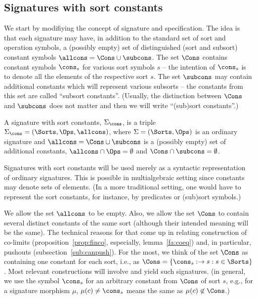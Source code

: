 
\subsection{Signatures with sort constants}\label{sub:gsp}
We start by modifiying the concept of signature and specification. The idea
is that each signature may have, in addition to the standard set of sort and
operation symbols, a (possibly empty) set of distinguished (sort and subsort) constant
symbols $\allcons = \Cons\cup\subcons$. 
The set $\Cons$ %
contains  constant symbols
$\cons_s$ for various sort symbols $s$ -- the intention of $\cons_s$ is to denote all the elements of the respective
sort $s$. 
The set $\subcons$  may contain additional constants
which will represent various subsorts -- the constants from this set are
called ``subsort constants''. (Usually, the distinction between $\Cons$ and
$\subcons$ does not matter and then we will write ``(sub)sort constants''.)
\begin{definition}
\label{def:modsign}
A signature with sort constants, $\Sigma_\cons$, is a triple $\Sigma_\cons =
 (\Sorts,\Ops,\allcons)$, where $\Sigma=(\Sorts,\Ops)$ is an ordinary
 signature and $\allcons=\Cons\cup\subcons$ is a (possibly empty) set of additional constants,
 $\allcons\cap\Ops=\emptyset$ and $\Cons\cap\subcons=\emptyset$. 
\end{definition}
%
Signatures with sort constants will be used merely as a syntactic representation of 
ordinary signatures. This is possible in multialgebraic setting since
constants may denote sets of elements. (In a more traditional setting, one would
have to represent the sort constants, for instance, by predicates or (sub)sort symbols.)

We allow the set $\allcons$ to be empty. Also, we allow the set
$\Cons$ to contain several distinct constants of the same sort (although
their intended meaning will be the same).
The technical reasons for that come up in relating construction of co-limits
(proposition~\ref{prop:finco}, especially, lemma~\ref{fa:coeq}) and, in particular, pushouts
(subsection~\ref{sub:canpush}). For the most, we think of the set
$\Cons$ as containing one constant for each sort, i.e., as
$\Cons=\{\cons_s:\to s : s\in\Sorts\}$. Most relevant constructions will
involve and yield such signatures. (in general, we use the symbol $\cons_s$
for an arbitrary constant from $\Cons$ of sort $s$, e.g., for a signature
morphism $\mu$, 
$\mu(c)\not=\cons_s$ means the same as $\mu(c)\not\in\Cons$.)


